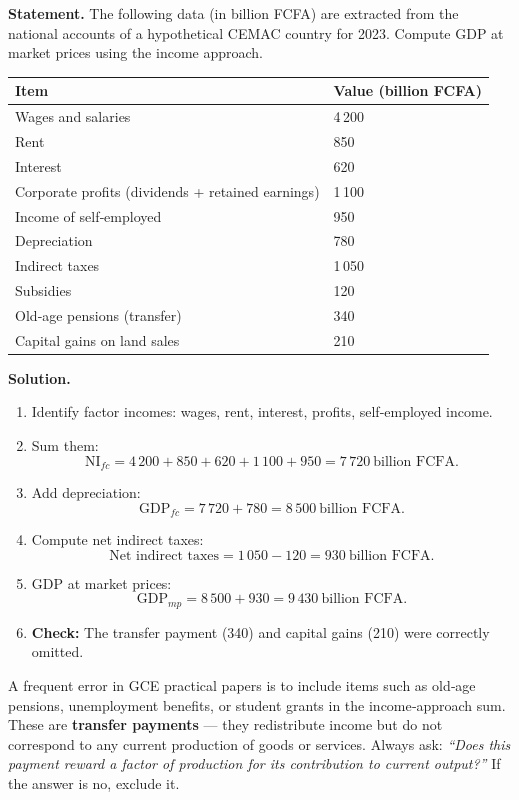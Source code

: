 \documentclass[11pt]{article}
\begin{document}
\begin{exoresolu}
\textbf{Statement.}  The following data (in billion FCFA) are extracted from the national accounts of a hypothetical CEMAC country for 2023.  Compute GDP at market prices using the income approach.

\begin{center}
\begin{tabularx}{\linewidth}{|l|X|}\hline
\rowcolor{popblueL}
Item & Value (billion FCFA) \\ \hline
Wages and salaries & 4\,200 \\
Rent & 850 \\
Interest & 620 \\
Corporate profits (dividends + retained earnings) & 1\,100 \\
Income of self‑employed & 950 \\
Depreciation & 780 \\
Indirect taxes & 1\,050 \\
Subsidies & 120 \\
Old‑age pensions (transfer) & 340 \\
Capital gains on land sales & 210 \\ \hline
\end{tabularx}
\end{center}
\tcblower
\textbf{Solution.}
\begin{enumerate}
\item Identify factor incomes: wages, rent, interest, profits, self‑employed income.
\item Sum them:
\[
\text{NI}_{fc}=4\,200+850+620+1\,100+950 = 7\,720\ \text{billion FCFA}.
\]
\item Add depreciation:
\[
\text{GDP}_{fc}=7\,720+780 = 8\,500\ \text{billion FCFA}.
\]
\item Compute net indirect taxes:
\[
\text{Net indirect taxes}=1\,050-120 = 930\ \text{billion FCFA}.
\]
\item GDP at market prices:
\[
\text{GDP}_{mp}=8\,500+930 = 9\,430\ \text{billion FCFA}.
\]
\item \textbf{Check:} The transfer payment (340) and capital gains (210) were correctly omitted.
\end{enumerate}
\end{exoresolu}

\begin{attention}
A frequent error in GCE practical papers is to include items such as old‑age pensions, unemployment benefits, or student grants in the income‑approach sum.  These are \textbf{transfer payments} — they redistribute income but do not correspond to any current production of goods or services.  Always ask: \emph{“Does this payment reward a factor of production for its contribution to current output?”}  If the answer is no, exclude it.
\end{attention}
\end{document}
